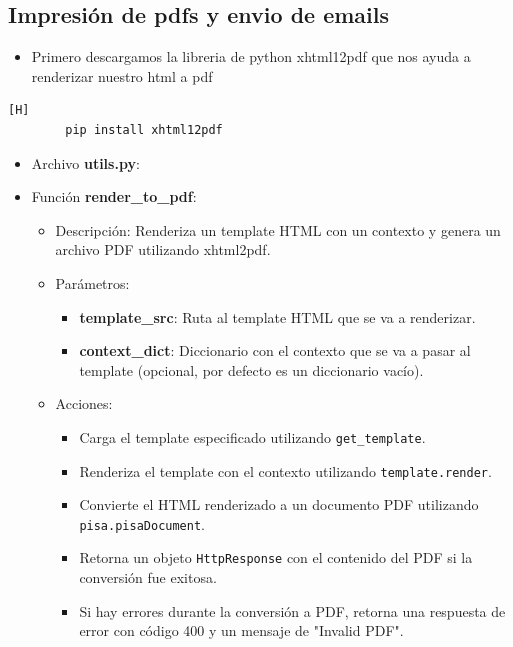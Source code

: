\documentclass{article}
\begin{document}
    \subsection{Impresión de pdfs y envio de emails}
    \begin{itemize}	
        \item Primero descargamos la libreria de python xhtml12pdf que nos ayuda a renderizar nuestro html a pdf
    \end{itemize}	
    \begin{lstlisting}[language=bash,caption={migraciones}][H]
        pip install xhtml12pdf
	\end{lstlisting}
    \begin{itemize}
        \item Archivo \textbf{utils.py}:
        \item Función \textbf{render\_to\_pdf}:
            \begin{itemize}
                \item Descripción: Renderiza un template HTML con un contexto y genera un archivo PDF utilizando xhtml2pdf.
                \item Parámetros:
                    \begin{itemize}
                        \item \textbf{template\_src}: Ruta al template HTML que se va a renderizar.
                        \item \textbf{context\_dict}: Diccionario con el contexto que se va a pasar al template (opcional, por defecto es un diccionario vacío).
                    \end{itemize}
                \item Acciones:
                    \begin{itemize}
                        \item Carga el template especificado utilizando \texttt{get\_template}.
                        \item Renderiza el template con el contexto utilizando \texttt{template.render}.
                        \item Convierte el HTML renderizado a un documento PDF utilizando \texttt{pisa.pisaDocument}.
                        \item Retorna un objeto \texttt{HttpResponse} con el contenido del PDF si la conversión fue exitosa.
                        \item Si hay errores durante la conversión a PDF, retorna una respuesta de error con código 400 y un mensaje de "Invalid PDF".
                    \end{itemize}
            \end{itemize}
    \end{itemize}
\end{document}
